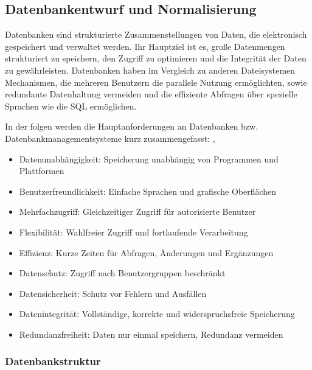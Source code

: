 \subsection{Datenbankentwurf und Normalisierung}
\label{subsec:datenbankentwurf-und-normalisierung}
Datenbanken sind strukturierte Zusammenstellungen von Daten, die elektronisch gespeichert und verwaltet werden.
Ihr Hauptziel ist es, große Datenmengen strukturiert zu speichern, den Zugriff zu optimieren und die Integrität der Daten zu gewährleisten.
Datenbanken haben im Vergleich zu anderen Dateisystemen Mechanismen, die mehreren Benutzern die parallele Nutzung ermöglichten,
sowie redundante Datenhaltung vermeiden und die effiziente Abfragen über spezielle Sprachen wie die \ac{SQL} ermöglichen.\cite*[6]{Fuchs2021}

In der folgen werden die Hauptanforderungen an Datenbanken bzw. Datenbankmanagementsysteme kurz zusammengefasst:  \cite*[7]{Herrmann2018},\cite*[6]{Fuchs2021}
\begin{itemize}
\item Datenunabhängigkeit: Speicherung unabhängig von Programmen und Plattformen
\item
Benutzerfreundlichkeit: Einfache Sprachen und grafische Oberflächen
\item
Mehrfachzugriff: Gleichzeitiger Zugriff für autorisierte Benutzer
\item
Flexibilität: Wahlfreier Zugriff und fortlaufende Verarbeitung
\item
Effizienz: Kurze Zeiten für Abfragen, Änderungen und Ergänzungen
\item
Datenschutz: Zugriff nach Benutzergruppen beschränkt
\item
Datensicherheit: Schutz vor Fehlern und Ausfällen
\item
Datenintegrität: Vollständige, korrekte und widerspruchsfreie Speicherung
\item
Redundanzfreiheit: Daten nur einmal speichern, Redundanz vermeiden
\end{itemize}



\subsubsection{Datenbankstruktur}

